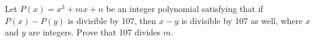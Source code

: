Let $ P(x) = x^3 + mx + n$ be an integer polynomial satisfying that if $ P(x) - P(y)$ is divisible by 107, then $ x - y$ is divisible by 107 as well, where $ x$ and $ y$ are integers. Prove that 107 divides $ m$.